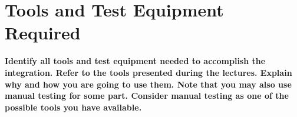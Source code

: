 \chapter{Tools and Test Equipment Required}\label{chap:tools}


\textbf{Identify all tools and test equipment needed to accomplish the integration. Refer to the tools presented during the lectures. Explain why and how you are going to use them. Note that you may also use manual testing for some part. Consider manual testing as one of the possible tools you have available.}